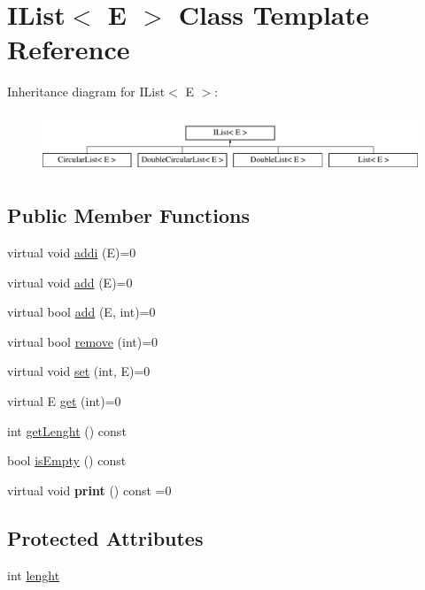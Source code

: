 \hypertarget{classIList}{\section{I\-List$<$ E $>$ Class Template Reference}
\label{classIList}
}
Inheritance diagram for I\-List$<$ E $>$\-:\begin{figure}[H]
\begin{center}
\leavevmode
\includegraphics[height=1.783440cm]{classIList}
\end{center}
\end{figure}
\subsection*{Public Member Functions}
\begin{DoxyCompactItemize}
\item 
virtual void \hyperlink{classIList_af202dc9e748ee32238d80e57dfbcae20}{addi} (E)=0
\item 
virtual void \hyperlink{classIList_a27500caa3d9da05aa6437d5ff56b09e2}{add} (E)=0
\item 
virtual bool \hyperlink{classIList_a70140dbc9de2b9f6e5ffd2212d5ea8b0}{add} (E, int)=0
\item 
virtual bool \hyperlink{classIList_a9bf7d737252dfbd4c9a5d7be36ea4231}{remove} (int)=0
\item 
virtual void \hyperlink{classIList_a119ed658d2804aec0b9fef9325c03073}{set} (int, E)=0
\item 
virtual E \hyperlink{classIList_a60570f7ee0e7474d01b2f364bad996a0}{get} (int)=0
\item 
int \hyperlink{classIList_a6d43df225c304c3a0abdb4c7d81274b5}{get\-Lenght} () const 
\item 
bool \hyperlink{classIList_ad21f4969c574c87a4715d45496d81d5c}{is\-Empty} () const 
\item 
\hypertarget{classIList_a866f15c0f36c1792acc3d09a7f9ebcc2}{virtual void {\bfseries print} () const =0}\label{classIList_a866f15c0f36c1792acc3d09a7f9ebcc2}

\end{DoxyCompactItemize}
\subsection*{Protected Attributes}
\begin{DoxyCompactItemize}
\item 
int \hyperlink{classIList_a64ce981ba1104bbb482068983cb5a3bc}{lenght}
\end{DoxyCompactItemize}


